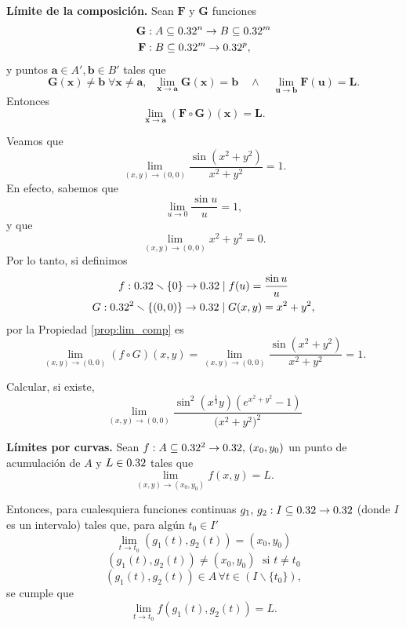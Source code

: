 \begin{propertie} \textbf{L\'imite de la composici\'on.} \label{prop:lim_comp} Sean $\mathbf{F}$ y $\mathbf{G}$ funciones 
\begin{align*}
 \mathbf{G} &:A  \subseteq  0.32^n \to B  \subseteq  0.32^m \\
 \mathbf{F} &:B  \subseteq  0.32^m \to 0.32^p,
\end{align*}
y puntos $\mathbf{a} \in A', \mathbf{b} \in B'$ tales que 
\[
 \mathbf{G}(\mathbf{x})\neq  \mathbf{b} \; \forall  \mathbf{x}\neq\mathbf{a},    \;\; \lim_{\mathbf{x} \to \mathbf{a}} \mathbf{G}(\mathbf{x}) = \mathbf{b} \quad \wedge \quad \lim_{\mathbf{u} \to \mathbf{b}} \mathbf{F}(\mathbf{u}) = \mathbf{L}.
\]
Entonces
\[
 \lim_{\mathbf{x} \to \mathbf{a}} \left( \mathbf{F} \circ \mathbf{G} \right)(\mathbf{x}) = \mathbf{L}.
\]
\end{propertie}
\begin{example}
 Veamos que 
 \[
  \lim_{(x,y) \to (0,0)} \frac{\sin(x^2 + y^2)}{x^2 + y^2} = 1.
 \]
 En efecto, sabemos que 
  \[
    \lim_{u \to 0} \frac{\sin u}{u} = 1,
  \]
  y que
  \[
    \lim_{(x,y) \to (0,0)} x^2 + y^2 = 0.
  \]  
  Por lo tanto, si definimos 
  \begin{gather*}
   f: 0.32 \smallsetminus \{0\} \to 0.32 \;|\;f(u) = \frac{\sin u}{u} \\
   G: 0.32^2 \smallsetminus \{(0,0)\} \to 0.32 \;|\; G(x,y) = x^2 + y^2,
  \end{gather*}
  por la Propiedad \ref{prop:lim_comp} es
  \[
   \lim_{(x,y) \to (0,0)} \left( f \circ G \right)(x,y) = 
   \lim_{(x,y) \to (0,0)} \frac{\sin(x^2 + y^2)}{x^2 + y^2} = 1.
  \]
\end{example}

\begin{tarea}  Calcular, si existe,   $$\lim_{(x,y)\rightarrow (0,0)}  \dfrac{\sin^{2}(x^{\frac{1}{3}}y)   (e^{ x^{2}+ y^{2} }-1)}{\big( x^{2}+y^{2} \big)^{2}}$$
\end{tarea}


\begin{corollary} \textbf{L\'imites por curvas.} \label{cor:lim_curva}
  Sean $f: A  \subseteq  0.32^2 \to 0.32, \, (x_0,y_0)$ un punto de acumulaci\'on de $A$ y $L \in 0.32$ tales que 
  \[
   \lim_{(x,y) \to (x_0,y_0)} f(x,y) = L.
  \]

  Entonces, para cualesquiera funciones continuas $g_1, \, g_2 : I  \subseteq  0.32 \to 0.32$ (donde $I$ es un intervalo) tales que, para alg\'un $t_0 \in I'$
  \[
    \lim_{t \to t_0} \left( g_1(t),g_2(t) \right) = \left( x_0 , y_0 \right)
  \]
$$ \left( g_1(t),g_2(t) \right) \neq (x_0, y_0) \;\mbox{ si }  t\neq t_0$$
  $$\left( g_1(t), g_2(t) \right) \in A \, \forall t \in \left( I \smallsetminus \{t_0\} \right),$$ se cumple que
  \[
   \lim_{t \to t_0} f\left( g_1(t),g_2(t) \right) = L.
  \]
\end{corollary}


